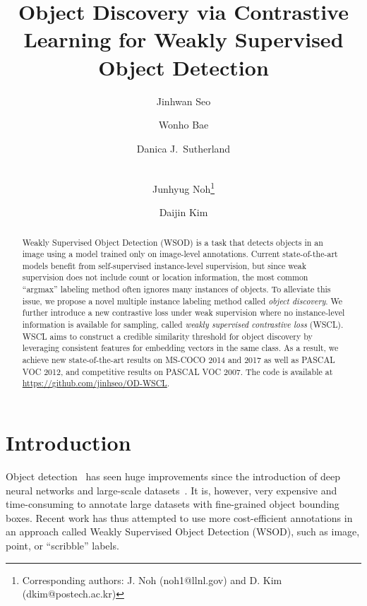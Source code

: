 \documentclass[runningheads]{llncs}
\makeatletter
\newcommand{\printfnsymbol}[1]{\textsuperscript{\@fnsymbol{#1}}}
\makeatother
\begin{document}
\sloppy
\pagestyle{headings}
\mainmatter
\def\ECCVSubNumber{5458}  

\title{Object Discovery via Contrastive Learning for Weakly Supervised Object Detection} 



\author{Jinhwan Seo\and
Wonho Bae\and
Danica J.\ Sutherland\and\\
Junhyug Noh\thanks{Corresponding authors: J. Noh (noh1@llnl.gov) and D. Kim (dkim@postech.ac.kr)}\and
Daijin Kim\printfnsymbol{1}} 
\maketitle


\begin{abstract}
Weakly Supervised Object Detection (WSOD) is a task that detects objects in an image using a model trained only on image-level annotations.
Current state-of-the-art models benefit from self-supervised instance-level supervision, but since weak supervision does not include count or location information, the most common ``argmax'' labeling method often ignores many instances of objects.
To alleviate this issue, we propose a novel multiple instance labeling method called \textit{object discovery}.
We further introduce a new contrastive loss under weak supervision where no instance-level information is available for sampling, called \textit{weakly supervised contrastive loss} (WSCL).
WSCL aims to construct a credible similarity threshold for object discovery by leveraging consistent features for embedding vectors in the same class.
As a result, we achieve new state-of-the-art results on MS-COCO 2014 and 2017 as well as PASCAL VOC 2012, and competitive results on PASCAL VOC 2007. The code is available at \url{https://github.com/jinhseo/OD-WSCL}.

\end{abstract}

\section{Introduction}
\label{sec:intro}
Object detection~\cite{ren2015faster,long2015fully,redmon2016you,liu2016ssd} has seen huge improvements since the introduction of deep neural networks and large-scale datasets~\cite{Everingham15,lin2014microsoft,deng2009imagenet}.
It is, however, very expensive and time-consuming to annotate large datasets with fine-grained object bounding boxes.
Recent work has thus attempted to use more cost-efficient annotations in an approach called Weakly Supervised Object Detection (WSOD),
such as image, point, or ``scribble'' labels.
\end{document}
